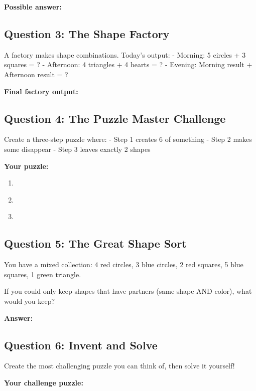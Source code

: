 \documentclass{article}
\begin{document}
\textbf{Possible answer:} \underline{\hspace{6cm}}

\subsection*{Question 3: The Shape Factory}
A factory makes shape combinations. Today's output:
- Morning: 5 circles + 3 squares = ?
- Afternoon: 4 triangles + 4 hearts = ?
- Evening: Morning result + Afternoon result = ?

\textbf{Final factory output:} \underline{\hspace{5cm}}

\subsection*{Question 4: The Puzzle Master Challenge}
Create a three-step puzzle where:
- Step 1 creates 6 of something
- Step 2 makes some disappear  
- Step 3 leaves exactly 2 shapes

\textbf{Your puzzle:}
\begin{enumerate}
    \item \underline{\hspace{6cm}}
    \item \underline{\hspace{6cm}}
    \item \underline{\hspace{6cm}}
\end{enumerate}

\subsection*{Question 5: The Great Shape Sort}
You have a mixed collection: 4 red circles, 3 blue circles, 2 red squares, 5 blue squares, 1 green triangle.

If you could only keep shapes that have partners (same shape AND color), what would you keep?

\textbf{Answer:} \underline{\hspace{8cm}}

\subsection*{Question 6: Invent and Solve}
Create the most challenging puzzle you can think of, then solve it yourself!

\textbf{Your challenge puzzle:} \underline{\hspace{7cm}}
\end{document}
